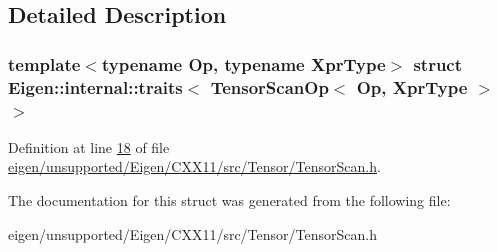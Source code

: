 \subsection{Detailed Description}
\subsubsection*{template$<$typename Op, typename Xpr\+Type$>$\newline
struct Eigen\+::internal\+::traits$<$ Tensor\+Scan\+Op$<$ Op, Xpr\+Type $>$ $>$}



Definition at line \hyperlink{eigen_2unsupported_2_eigen_2_c_x_x11_2src_2_tensor_2_tensor_scan_8h_source_l00018}{18} of file \hyperlink{eigen_2unsupported_2_eigen_2_c_x_x11_2src_2_tensor_2_tensor_scan_8h_source}{eigen/unsupported/\+Eigen/\+C\+X\+X11/src/\+Tensor/\+Tensor\+Scan.\+h}.



The documentation for this struct was generated from the following file\+:\begin{DoxyCompactItemize}
\item 
eigen/unsupported/\+Eigen/\+C\+X\+X11/src/\+Tensor/\+Tensor\+Scan.\+h\end{DoxyCompactItemize}
